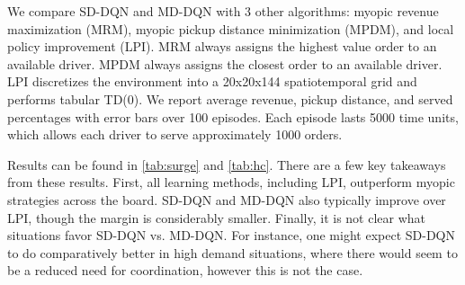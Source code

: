 We compare SD-DQN and MD-DQN with 3 other algorithms: myopic revenue maximization (MRM), myopic pickup distance minimization (MPDM), and local policy improvement (LPI). MRM always assigns the highest value order to an available driver. MPDM always assigns the closest order to an available driver. LPI \cite{xu2018large} discretizes the environment into a 20x20x144 spatiotemporal grid and performs tabular TD(0). We report average revenue, pickup distance, and served percentages with error bars over 100 episodes. Each episode lasts 5000 time units, which allows each driver to serve approximately 1000 orders. 

Results can be found in \cref{tab:surge} and \cref{tab:hc}. There are a few key takeaways from these results. First, all learning methods, including LPI, outperform myopic strategies across the board. SD-DQN and MD-DQN also typically improve over LPI, though the margin is considerably smaller. Finally, it is not clear what situations favor SD-DQN vs. MD-DQN. For instance, one might expect SD-DQN to do comparatively better in high demand situations, where there would seem to be a reduced need for coordination, however this is not the case.
\begin{center}
\begin{table}
\caption{Surge Domain}
\label{tab:surge}
\end{table}
\end{center}


